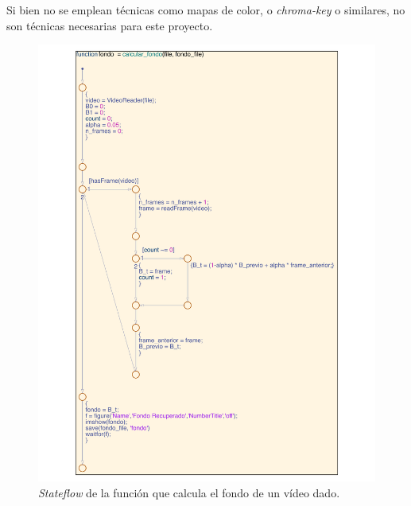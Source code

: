 \documentclass[11pt]{memoir}
\begin{document}
Si bien no se emplean técnicas como mapas de color, o \textit{chroma-key} o similares, no son técnicas necesarias para este proyecto.
\vfill
\begin{center}
\begin{figure}[H]
\includegraphics[width=\textwidth]{img/calc_fondo.pdf}
\caption{\textit{Stateflow} de la función que calcula el fondo de un vídeo dado.}\label{fig:calc-fondo}
\end{figure}
\end{center}
\newpage
\end{document}
